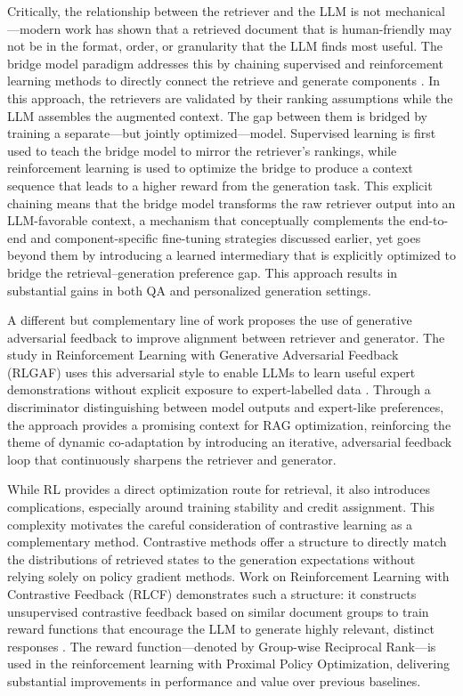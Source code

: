 \documentclass[11pt]{article}
\begin{document}
Critically, the relationship between the retriever and the LLM is not mechanical---modern work has shown that a retrieved document that is human-friendly may not be in the format, order, or granularity that the LLM finds most useful. The bridge model paradigm addresses this by chaining supervised and reinforcement learning methods to directly connect the retrieve and generate components \cite{ref80}. In this approach, the retrievers are validated by their ranking assumptions while the LLM assembles the augmented context. The gap between them is bridged by training a separate---but jointly optimized---model. Supervised learning is first used to teach the bridge model to mirror the retriever's rankings, while reinforcement learning is used to optimize the bridge to produce a context sequence that leads to a higher reward from the generation task. This explicit chaining means that the bridge model transforms the raw retriever output into an LLM-favorable context, a mechanism that conceptually complements the end-to-end and component-specific fine-tuning strategies discussed earlier, yet goes beyond them by introducing a learned intermediary that is explicitly optimized to bridge the retrieval--generation preference gap. This approach results in substantial gains in both QA and personalized generation settings.

A different but complementary line of work proposes the use of generative adversarial feedback to improve alignment between retriever and generator. The study in Reinforcement Learning with Generative Adversarial Feedback (RLGAF) uses this adversarial style to enable LLMs to learn useful expert demonstrations without explicit exposure to expert-labelled data \cite{ref81}. Through a discriminator distinguishing between model outputs and expert-like preferences, the approach provides a promising context for RAG optimization, reinforcing the theme of dynamic co-adaptation by introducing an iterative, adversarial feedback loop that continuously sharpens the retriever and generator.

While RL provides a direct optimization route for retrieval, it also introduces complications, especially around training stability and credit assignment. This complexity motivates the careful consideration of contrastive learning as a complementary method. Contrastive methods offer a structure to directly match the distributions of retrieved states to the generation expectations without relying solely on policy gradient methods. Work on Reinforcement Learning with Contrastive Feedback (RLCF) demonstrates such a structure: it constructs unsupervised contrastive feedback based on similar document groups to train reward functions that encourage the LLM to generate highly relevant, distinct responses \cite{ref82}. The reward function---denoted by Group-wise Reciprocal Rank---is used in the reinforcement learning with Proximal Policy Optimization, delivering substantial improvements in performance and value over previous baselines.
\end{document}
